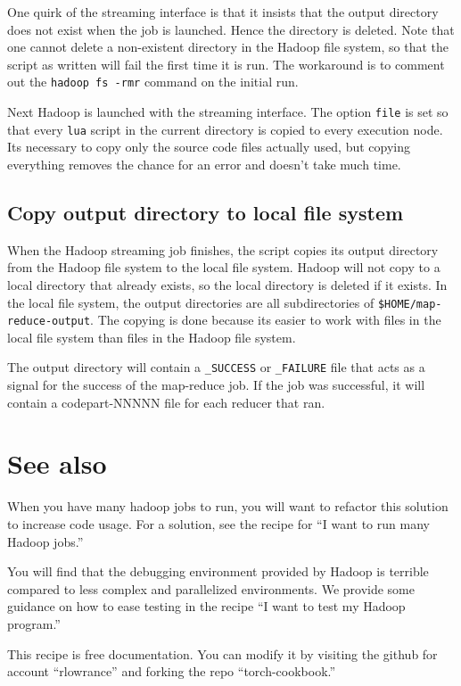 \documentclass{article}
\let\code\texttt %
\begin{document}
One quirk of the streaming interface is that it insists that the output
directory does not exist when the job is launched. Hence the directory
is deleted. Note that one cannot delete a non-existent directory in the
Hadoop file system, so that the script as written will fail the first
time it is run. The workaround is to comment out the \code{hadoop fs
-rmr} command on the initial run.

Next Hadoop is launched with the streaming interface. The option
\code{file} is set so that every \code{lua} script in the current
directory is copied to every execution node. Its necessary to copy only
the source code files actually used, but copying everything removes the
chance for an error and doesn't take much time.

\subsection{Copy output directory to local file system}

When the Hadoop streaming job finishes, the script copies its output
directory from the Hadoop file system to the local file system. Hadoop
will not copy to a local directory that already exists, so the local
directory is deleted if it exists. In the local file system, the output
directories are all subdirectories of \code{\$HOME/map-reduce-output}.
The copying is done because its easier
to work with files in the local file system than files in the Hadoop
file system.

The output directory will contain a \code{\_SUCCESS} or \code{\_FAILURE}
file that acts as a signal for the success of the map-reduce job. If the
job was successful, it will contain a code{part-NNNNN} file for each
reducer that ran.


\section{See also}

When you have many hadoop jobs to run, you will want to refactor this
solution to increase code usage. For a solution, see the recipe for ``I
want to run many Hadoop jobs.''

You will find that the debugging environment provided by Hadoop is
terrible compared to less complex and parallelized environments. We
provide some guidance on how to ease testing in the recipe ``I want to
test my Hadoop program.''

This recipe is free documentation. You can modify it by visiting the
github for account ``rlowrance'' and forking the repo
``torch-cookbook.''
\end{document}
